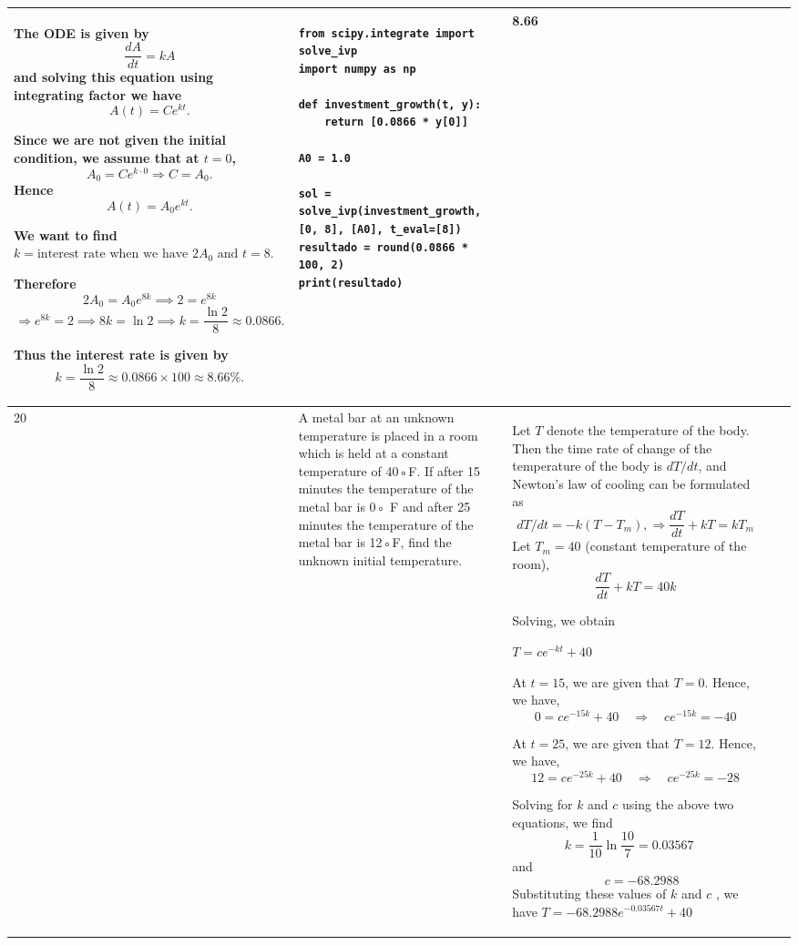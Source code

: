\documentclass[a4paper,12pt]{article}
\begin{document}
\begin{longtable}{|p{0.3cm}|p{}|p{10cm}|p{}|p{1.5cm}|}
The ODE is given by
\[
\frac{dA}{dt} = kA
\]
and solving this equation using integrating factor we have
\[
A(t) = C e^{kt}.
\]

Since we are not given the initial condition, we assume that at \( t = 0 \),
\[
A_0 = C e^{k \cdot 0} \Rightarrow C = A_0.
\]
Hence
\[
A(t) = A_0 e^{kt}.
\]

We want to find \( k = \text{interest rate when we have } 2A_0 \text{ and } t = 8. \)

Therefore
\[
2A_0 = A_0 e^{8k} \implies 2 = e^{8k}
\]
\[
\Rightarrow e^{8k} = 2 \implies 8k = \ln 2 \implies k = \frac{\ln 2}{8} \approx 0.0866.
\]

Thus the interest rate is given by
\[
k = \frac{\ln 2}{8} \approx 0.0866 \times 100 \approx 8.66\%.
\]
               &\begin{verbatim}
from scipy.integrate import solve_ivp
import numpy as np

def investment_growth(t, y):
    return [0.0866 * y[0]]

A0 = 1.0

sol = solve_ivp(investment_growth, [0, 8], [A0], t_eval=[8])
resultado = round(0.0866 * 100, 2)
print(resultado) \end{verbatim}&  8.66               \\ \hline
    20             & A metal bar at an unknown temperature is placed in a room which is held at a constant temperature of 40◦F. If after 15 minutes the temperature of the metal bar  is 0◦ F and after 25 minutes the temperature of the metal bar is 12◦F, find the unknown initial temperature.               & Let \( T \) denote the temperature of the body. Then the time rate of change of the temperature of the body is \( dT/dt \), and Newton’s law of cooling can be formulated as  
\[
dT/dt = -k(T - T_m), \Rightarrow \frac{dT}{dt} + kT = kT_m
\]
Let  $T_m = 40$ (constant temperature of the room),  
\[
\frac{dT}{dt} + kT = 40k
\]

Solving, we obtain  

$T = ce^{-kt} + 40$


At \( t = 15 \), we are given that \( T = 0 \). Hence, we have,  
\[
0 = ce^{-15k} + 40 \quad \Rightarrow \quad ce^{-15k} = -40
\]

At \( t = 25 \), we are given that \( T = 12 \). Hence, we have,  
\[
12 = ce^{-25k} + 40 \quad \Rightarrow \quad ce^{-25k} = -28 
\]

Solving  for \( k \) and \( c \) using the above two equations, we find  
\[
k = \frac{1}{10} \ln\frac{10}{7}  =0.03567 \quad\] and   \[\quad c = -68.2988
\]
Substituting these values of  \( k \) and \( c \) , we have 
$T = -68.2988e^{-0.03567t} + 40$


\end{longtable}
\end{document}
